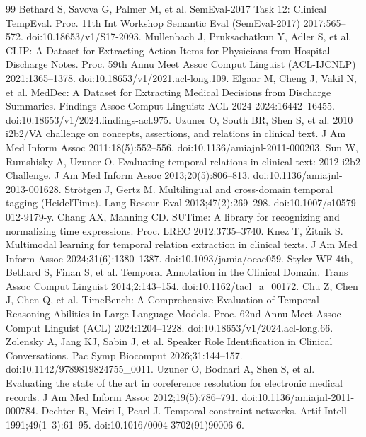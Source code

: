 \begin{thebibliography}{99}
\label{r39} Bethard S, Savova G, Palmer M, et al. SemEval-2017 Task 12: Clinical TempEval. Proc. 11th Int Workshop Semantic Eval (SemEval-2017) 2017:565--572. doi:10.18653/v1/S17-2093.
\label{r40} Mullenbach J, Pruksachatkun Y, Adler S, et al. CLIP: A Dataset for Extracting Action Items for Physicians from Hospital Discharge Notes. Proc. 59th Annu Meet Assoc Comput Linguist (ACL-IJCNLP) 2021:1365--1378. doi:10.18653/v1/2021.acl-long.109.
\label{r41} Elgaar M, Cheng J, Vakil N, et al. MedDec: A Dataset for Extracting Medical Decisions from Discharge Summaries. Findings Assoc Comput Linguist: ACL 2024 2024:16442--16455. doi:10.18653/v1/2024.findings-acl.975.
\label{r42} Uzuner O, South BR, Shen S, et al. 2010 i2b2/VA challenge on concepts, assertions, and relations in clinical text. J Am Med Inform Assoc 2011;18(5):552--556. doi:10.1136/amiajnl-2011-000203.
\label{r43} Sun W, Rumshisky A, Uzuner O. Evaluating temporal relations in clinical text: 2012 i2b2 Challenge. J Am Med Inform Assoc 2013;20(5):806--813. doi:10.1136/amiajnl-2013-001628.
\label{r44} Strötgen J, Gertz M. Multilingual and cross-domain temporal tagging (HeidelTime). Lang Resour Eval 2013;47(2):269--298. doi:10.1007/s10579-012-9179-y.
\label{r45} Chang AX, Manning CD. SUTime: A library for recognizing and normalizing time expressions. Proc. LREC 2012:3735--3740.
\label{r46} Knez T, Žitnik S. Multimodal learning for temporal relation extraction in clinical texts. J Am Med Inform Assoc 2024;31(6):1380--1387. doi:10.1093/jamia/ocae059.
\label{r47} Styler WF 4th, Bethard S, Finan S, et al. Temporal Annotation in the Clinical Domain. Trans Assoc Comput Linguist 2014;2:143--154. doi:10.1162/tacl\_a\_00172.
\label{r48} Chu Z, Chen J, Chen Q, et al. TimeBench: A Comprehensive Evaluation of Temporal Reasoning Abilities in Large Language Models. Proc. 62nd Annu Meet Assoc Comput Linguist (ACL) 2024:1204--1228. doi:10.18653/v1/2024.acl-long.66.
\label{r49} Zolensky A, Jang KJ, Sabin J, et al. Speaker Role Identification in Clinical Conversations. Pac Symp Biocomput 2026;31:144--157. doi:10.1142/9789819824755\_0011.
\label{r50} Uzuner O, Bodnari A, Shen S, et al. Evaluating the state of the art in coreference resolution for electronic medical records. J Am Med Inform Assoc 2012;19(5):786--791. doi:10.1136/amiajnl-2011-000784.
\label{r51} Dechter R, Meiri I, Pearl J. Temporal constraint networks. Artif Intell 1991;49(1--3):61--95. doi:10.1016/0004-3702(91)90006-6.

\end{thebibliography}
